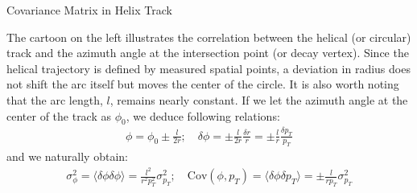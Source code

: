\documentclass[
	xcolor=dvipsnames,
	aspectratio=169,	
	10pt, 
	]{beamer}
\begin{document}
\begin{frame}{Covariance Matrix in Helix Track}
	\begin{block}{}
{
	The cartoon on the left illustrates the correlation between the helical (or circular) track and the azimuth angle at the intersection point (or decay vertex). Since the helical trajectory is defined by measured spatial points, a deviation in radius does not shift the arc itself but moves the center of the circle. It is also worth noting that the arc length, $l$, remains nearly constant. 
}
If we let the azimuth angle at the center of the track as $\phi_0$, we deduce following relations:
\vspace{-4 mm}
\begin{align}
	\phi = \phi_0 \pm \frac{l}{2r};\quad  \delta\phi = \pm\frac{l}{2r}\frac{\delta r}{r}= \pm\frac{l}{r}\frac{\delta p_T}{p_T}
\end{align}
\vspace{-2 mm}
and we naturally obtain:
\vspace{-2 mm}
\begin{align}
	\sigma_{\phi}^2 = \langle\delta\phi\delta\phi\rangle=\frac{l^2}{r^2p_{T}^2}\sigma^2_{p_T};\quad \textrm{Cov}(\phi,p_T)= \langle\delta\phi\delta p_T \rangle = \pm \frac{l}{rp_T}\sigma_{p_T}^2
\end{align}
\end{block}
\end{frame}
\end{document}
